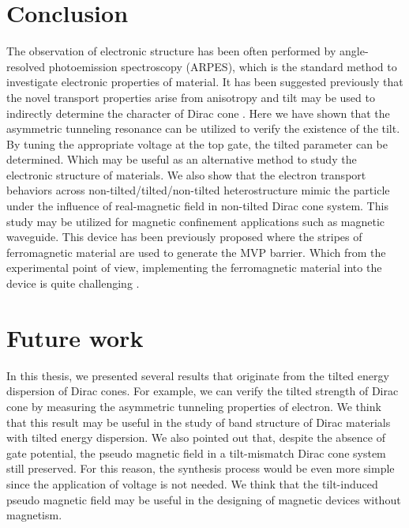 \section{Conclusion}
    The observation of electronic structure has been often performed by angle-resolved photoemission spectroscopy (ARPES), which is the standard method to investigate electronic properties of material. 
    It has been suggested previously that the novel transport properties arise from anisotropy and tilt may be used to indirectly determine the character of Dirac cone \cite{Zhang2018b}. 
    Here we have shown that the asymmetric tunneling resonance can be utilized to verify the existence of the tilt. 
    By tuning the appropriate voltage at the top gate, the tilted parameter can be determined. 
    Which may be useful as an alternative method to study the electronic structure of materials. 
    We also show that the electron transport behaviors across non-tilted/tilted/non-tilted heterostructure mimic the particle under the influence of real-magnetic field in non-tilted Dirac cone system. 
    This study may be utilized for magnetic confinement applications such as magnetic waveguide. 
    This device has been previously proposed where the stripes of ferromagnetic material are used to generate the MVP barrier. 
    Which from the experimental point of view, implementing the ferromagnetic material into the device is quite challenging \cite{Awschalom2009}. 
    

\section{Future work}
    In this thesis, we presented several results that originate from the tilted energy dispersion of Dirac cones.
    For example, we can verify the tilted strength of Dirac cone by measuring the asymmetric tunneling properties of electron.
    We think that this result may be useful in the study of band structure of Dirac materials with tilted energy dispersion.
    We also pointed out that, despite the absence of gate potential, the pseudo magnetic field in a tilt-mismatch Dirac cone system still preserved.
    For this reason, the synthesis process would be even more simple since the application of voltage is not needed.  
    We think that the tilt-induced pseudo magnetic field may be useful in the designing of magnetic devices without magnetism. 

